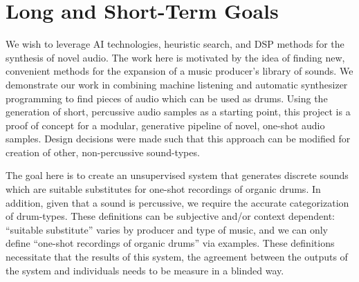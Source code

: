 \documentclass[\main/thesis.tex]{subfiles}
\begin{document}


\section{Long and Short-Term Goals}
We wish to leverage AI technologies, heuristic search, and DSP methods for the synthesis of novel audio. The work here is motivated by the idea of finding new, convenient methods for the expansion of a music producer's library of sounds. We demonstrate our work in combining machine listening and automatic synthesizer programming to find pieces of audio which can be used as drums. Using the generation of short, percussive audio samples as a starting point, this project is a proof of concept for a modular, generative pipeline of novel, one-shot audio samples. Design decisions were made such that this approach can be modified for creation of other, non-percussive sound-types. 

The goal here is to create an unsupervised system that generates discrete sounds which are suitable substitutes for one-shot recordings of organic drums. In addition, given that a sound is percussive, we require the accurate categorization of drum-types. These definitions can be subjective and/or context dependent: \enquote{suitable substitute} varies by producer and type of music, and we can only define \enquote{one-shot recordings of organic drums} via examples. These definitions necessitate that the results of this system, the agreement between the outputs of the system and individuals needs to be measure in a blinded way. 

\end{document}
